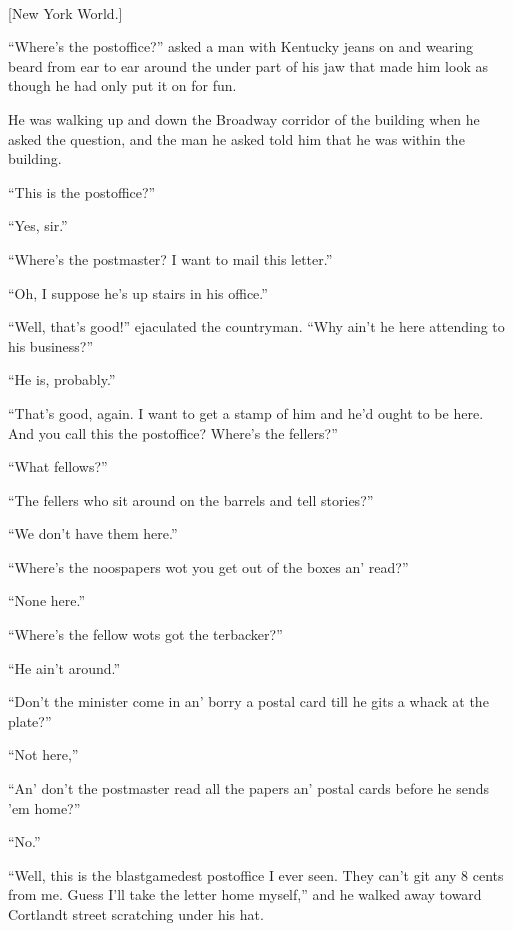 \begin{ipquote}
\begin{center}
\\
{[New York World.]}
\end{center}

“Where’s the postoffice?” asked a man with Kentucky jeans on and wearing beard from ear to ear around the under part of his jaw that made him look as though he had only put it on for fun.

He was walking up and down the Broadway corridor of the building when he asked the question, and the man he asked told him that he was within the building.

“This is the postoffice?”

“Yes, sir.”

“Where’s the postmaster? I want to mail this letter.”

“Oh, I suppose he’s up stairs in his office.”

“Well, that’s good!” ejaculated the countryman. “Why ain’t he here attending to his business?”

“He is, probably.”

“That’s good, again. I want to get a stamp of him and he’d ought to be here. And you call this the postoffice? Where’s the fellers?”

“What fellows?”

“The fellers who sit around on the barrels and tell stories?”

“We don’t have them here.”

“Where’s the noospapers wot you get out of the boxes an’ read?”

“None here.”

“Where’s the fellow wots got the terbacker?”

“He ain’t around.”

“Don’t the minister come in an’ borry a postal card till he gits a whack at the plate?”

“Not here,”

“An’ don’t the postmaster read all the papers an’ postal cards before he sends ’em home?”

“No.”

“Well, this is the blastgamedest postoffice I ever seen. They can’t git any 8 cents from me. Guess I’ll take the letter home myself,” and he walked away toward Cortlandt street scratching under his hat.
\end{ipquote}

